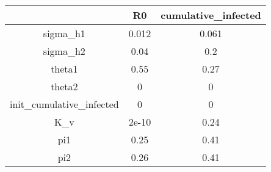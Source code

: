 \begin{tabular}{|c|c|c|}
\hline
& R0 & cumulative_infected \\
\hline
sigma_h1 & 0.012 & 0.061 \\
\hline
sigma_h2 & 0.04 & 0.2 \\
\hline
theta1 & 0.55 & 0.27 \\
\hline
theta2 & 0 & 0 \\
\hline
init_cumulative_infected & 0 & 0 \\
\hline
K_v & 2e-10 & 0.24 \\
\hline
pi1 & 0.25 & 0.41 \\
\hline
pi2 & 0.26 & 0.41 \\
\hline
\end{tabular}
